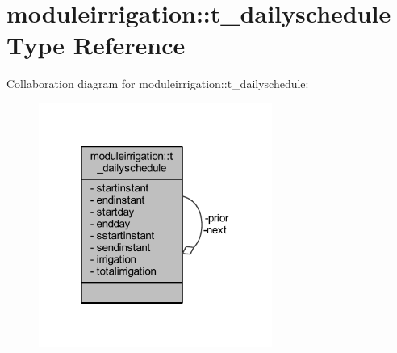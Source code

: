 \hypertarget{structmoduleirrigation_1_1t__dailyschedule}{}\section{moduleirrigation\+:\+:t\+\_\+dailyschedule Type Reference}
\label{structmoduleirrigation_1_1t__dailyschedule}


Collaboration diagram for moduleirrigation\+:\+:t\+\_\+dailyschedule\+:\nopagebreak
\begin{figure}[H]
\begin{center}
\leavevmode
\includegraphics[width=217pt]{structmoduleirrigation_1_1t__dailyschedule__coll__graph}
\end{center}
\end{figure}
